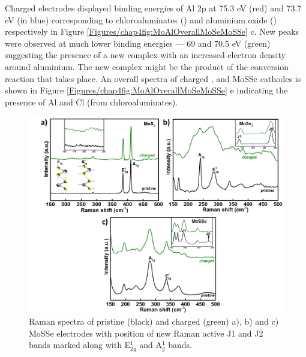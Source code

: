 Charged  electrodes displayed binding energies of Al 2p at 75.3 eV (red) and 73.7 eV (in blue) corresponding to chloroaluminates () and aluminium oxide () respectively in Figure \ref{Figures/chap4fig:MoAlOverallMoSeMoSSe} c. New peaks were observed at much lower binding energies --- 69 and 70.5 eV (green) suggesting the presence of a new complex with an increased electron density around aluminium. The new complex might be the product of the conversion reaction that takes place. An overall spectra of charged ,  and MoSSe cathodes is shown in Figure \ref{Figures/chap4fig:MoAlOverallMoSeMoSSe} e indicating the presence of Al and Cl (from chloroaluminates).
\begin{figure}
  \centering
  \includegraphics[width=\textwidth]{Figures/chap4fig/fig5}
  \caption{Raman spectra of pristine (black) and charged (green) a), b)  and c) MoSSe electrodes with position of new Raman active J1 and J2 bands marked along with E$^1_{2g}$ and A$^1_g$ bands.}
  \label{Figures/chap4fig:fig5}
\end{figure}
